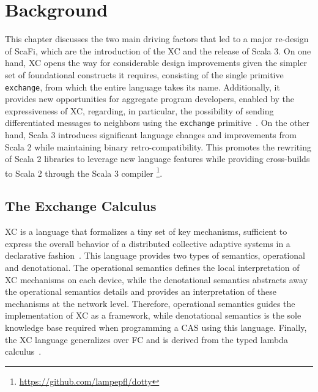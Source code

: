 \chapter{Background}
\label{chap:background}
This chapter discusses the two main driving factors that led to a major re-design of ScaFi, which are the introduction of the \ac{XC} and the release of Scala 3.
%
On one hand, \ac{XC} opens the way for considerable design improvements given the simpler set of foundational constructs it requires, consisting of the single primitive \texttt{exchange}, from which the entire language takes its name.
%
Additionally, it provides new opportunities for aggregate program developers, enabled by the expressiveness of \ac{XC}, regarding, in particular, the possibility of sending differentiated messages to neighbors using the \texttt{exchange} primitive~\cite{xc}.
%
On the other hand, Scala 3 introduces significant language changes and improvements from Scala 2 while maintaining binary retro-compatibility.
%
This promotes the rewriting of Scala 2 libraries to leverage new language features while providing cross-builds to Scala 2 through the Scala 3 compiler \footnote{\url{https://github.com/lampepfl/dotty}}.

\section{The Exchange Calculus}\label{chap:background->sec:xc}

\ac{XC} is a language that formalizes a tiny set of key mechanisms, sufficient to express the overall behavior of a distributed collective adaptive systems in a declarative fashion~\cite{xc}.
%
This language provides two types of semantics, operational and denotational.
%
The operational semantics defines the local interpretation of \ac{XC} mechanisms on each device, while the denotational semantics abstracts away the operational semantics details and provides an interpretation of these mechanisms at the network level.
%
Therefore, operational semantics guides the implementation of \ac{XC} as a framework, while denotational semantics is the sole knowledge base required when programming a \ac{CAS} using this language.
%
Finally, the \ac{XC} language generalizes over \ac{FC} and is derived from the typed lambda calculus~\cite{xc}.

